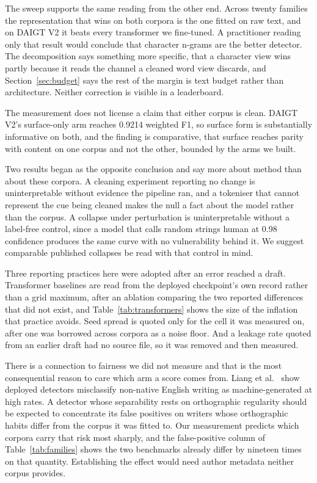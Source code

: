 \documentclass[conference,a4paper]{IEEEtran}
\begin{document}
The sweep supports the same reading from the other end. Across twenty families the representation that wins on both corpora is the one fitted on raw text, and on DAIGT V2 it beats every transformer we fine-tuned. A practitioner reading only that result would conclude that character n-grams are the better detector. The decomposition says something more specific, that a character view wins partly because it reads the channel a cleaned word view discards, and Section~\ref{sec:budget} says the rest of the margin is text budget rather than architecture. Neither correction is visible in a leaderboard.

The measurement does not license a claim that either corpus is clean. DAIGT V2's surface-only arm reaches 0.9214 weighted F1, so surface form is substantially informative on both, and the finding is comparative, that surface reaches parity with content on one corpus and not the other, bounded by the arms we built.

Two results began as the opposite conclusion and say more about method than about these corpora. A cleaning experiment reporting no change is uninterpretable without evidence the pipeline ran, and a tokeniser that cannot represent the cue being cleaned makes the null a fact about the model rather than the corpus. A collapse under perturbation is uninterpretable without a label-free control, since a model that calls random strings human at 0.98 confidence produces the same curve with no vulnerability behind it. We suggest comparable published collapses be read with that control in mind.

Three reporting practices here were adopted after an error reached a draft. Transformer baselines are read from the deployed checkpoint's own record rather than a grid maximum, after an ablation comparing the two reported differences that did not exist, and Table~\ref{tab:transformers} shows the size of the inflation that practice avoids. Seed spread is quoted only for the cell it was measured on, after one was borrowed across corpora as a noise floor. And a leakage rate quoted from an earlier draft had no source file, so it was removed and then measured.

There is a connection to fairness we did not measure and that is the most consequential reason to care which arm a score comes from. Liang et al.~\cite{Liang2023gpt} show deployed detectors misclassify non-native English writing as machine-generated at high rates. A detector whose separability rests on orthographic regularity should be expected to concentrate its false positives on writers whose orthographic habits differ from the corpus it was fitted to. Our measurement predicts which corpora carry that risk most sharply, and the false-positive column of Table~\ref{tab:families} shows the two benchmarks already differ by nineteen times on that quantity. Establishing the effect would need author metadata neither corpus provides.
\end{document}
